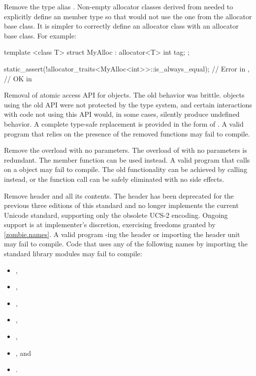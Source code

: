 \nodiffref
\change
Remove the type alias .
\rationale
Non-empty allocator classes derived from  needed to explicitly
define an  member type so that 
would not use the one from the allocator base class.
\effect
It is simpler to correctly define an allocator class with an allocator base
class. For example:
\begin{codeblock}
template <class T>
struct MyAlloc : allocator<T> {
  int tag;
};

static_assert(!allocator_traits<MyAlloc<int>>::is_always_equal);        // Error in \CppXXIII{},
                                                                        // OK in \CppXXVI{}
\end{codeblock}

\nodiffref
\change
Removal of atomic access API for  objects.
\rationale
The old behavior was brittle.  objects using the old API were
not protected by the type system, and certain interactions with code not using
this API would, in some cases, silently produce undefined behavior. A complete
type-safe replacement is provided in the form of .
\effect
A valid \CppXXIII{} program that relies on the presence of the removed functions
may fail to compile.

\nodiffref
\change
Remove the  overload with no parameters.
\rationale
The overload of  with no parameters is redundant.
The  member function can be used instead.
\effect
A valid \CppXXIII{} program that calls 
on a  object may fail to compile.
The old functionality can be achieved by calling  instead,
or the function call can be safely eliminated with no side effects.

\nodiffref
\change
Remove header  and all its contents.
\rationale
The header has been deprecated for the previous three editions of this standard
and no longer implements the current Unicode standard, supporting only the
obsolete UCS-2 encoding.
Ongoing support is at implementer's discretion,
exercising freedoms granted by \ref{zombie.names}.
\effect
A valid \CppXXIII{} program -ing the header or importing the
header unit may fail to compile. Code that uses any of the following names by
importing the standard library modules may fail to compile:
\begin{itemize}
\item {},
\item {},
\item {},
\item {},
\item {},
\item {}, and
\item {}.
\end{itemize}

